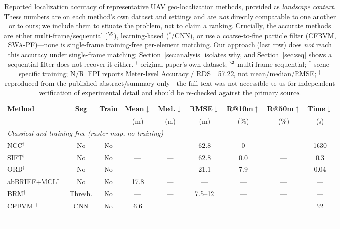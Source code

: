 \documentclass[10pt]{article}
\theoremstyle{plain}
\theoremstyle{definition}
\begin{document}
\begin{table}[htbp]
\caption{%
  Reported localization accuracy of representative UAV geo-localization methods,
  provided as \emph{landscape context}.
  These numbers are on each method's own dataset and settings and are
  \emph{not} directly comparable to one another or to ours; we include them to
  situate the problem, not to claim a ranking.
  Crucially, the accurate methods are either multi-frame/sequential ($^\S$),
  learning-based ($^*$/CNN), or use a coarse-to-fine particle filter (CFBVM,
  SWA-PF)---none is single-frame training-free per-element matching.
  Our approach (last row) does \emph{not} reach this accuracy under single-frame
  matching; Section~\ref{sec:analysis} isolates why, and
  Section~\ref{sec:seq} shows a sequential filter does not recover it either.
  $^\dagger$ original paper's own dataset;
  $^\S$ multi-frame sequential;
  $^*$ scene-specific training;
  N/R: FPI reports Meter-level Accuracy / RDS\,=\,57.22, not mean/median/RMSE;
  $^\ddagger$ reproduced from the published abstract/summary only---the full
  text was not accessible to us for independent verification of experimental
  detail and should be re-checked against the primary source.
}
\label{tab:main}
\centering\small
\setlength{\tabcolsep}{2pt}
\begin{tabular}{lcccccccc}
\toprule
\textbf{Method} & \textbf{Seg} & \textbf{Train} &
\textbf{Mean$\downarrow$} & \textbf{Med.$\downarrow$} & \textbf{RMSE$\downarrow$} &
\textbf{R@10m$\uparrow$} & \textbf{R@50m$\uparrow$} & \textbf{Time$\downarrow$} \\
 & & & (m) & (m) & (m) & (\%) & (\%) & (s) \\
\midrule
\multicolumn{9}{l}{\textit{Classical and training-free (raster map, no training)}} \\
NCC$^\dagger$
  & No & No & --- & --- & 62.8 & 0 & --- & 1630 \\
SIFT$^\dagger$~\cite{lowe2004sift}
  & No & No & --- & --- & 62.8 & 0.0 & --- & 0.3 \\
ORB$^\dagger$~\cite{rublee2011orb}
  & No & No & --- & --- & 21.1 & 7.9 & --- & 0.04 \\
abBRIEF+MCL$^\dagger$~\cite{mantelli2019abbrief}
  & No & No & 17.8 & --- & --- & --- & --- & --- \\
BRM$^\dagger$~\cite{choi2020brm}
  & Thresh. & No & --- & --- & 7.5--12 & --- & --- & --- \\
CFBVM$^\dagger$$^\ddagger$~\cite{ouyang2024cfbvm}
  & CNN & No & 6.6 & --- & --- & --- & --- & 22 \\
$$
\end{tabular}
\end{table}
\end{document}
